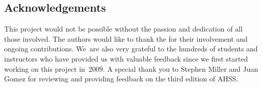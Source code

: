 \subsection*{{\color{oiB}Acknowledgements}}

This project would not be possible without the passion
and dedication of all those involved.
The authors would like to thank the
for their involvement and ongoing contributions.
We~are also very grateful to the hundreds of students
and instructors who have provided us with valuable feedback
since we first started working on this project in~2009.
A special thank you to Stephen Miller and Juan Gomez for reviewing and providing feedback on the third edition of AHSS.




